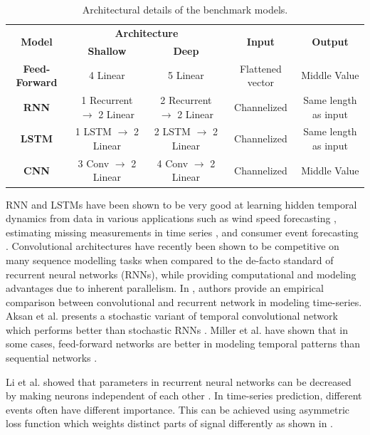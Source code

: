 \documentclass[letterpaper]{article}
\begin{document}
\begin{table}[h]
    \centering
    \begin{tabular}{c c c c c}
        \toprule
          \multirow{2}{*}{\textbf{Model}} & \multicolumn{2}{c}{\textbf{Architecture}} & \multirow{2}{*}{\textbf{Input}} & \multirow{2}{*}{\textbf{Output}} \\
          \cmidrule(lr){2-3}
          & \textbf{Shallow} & \textbf{Deep} & & \\
         \midrule
         \textbf{Feed-Forward} & 4 Linear & 5 Linear & Flattened vector & Middle Value \\
         \textbf{RNN} & 1 Recurrent $\rightarrow$ 2 Linear & 2 Recurrent $\rightarrow$ 2 Linear & Channelized & Same length as input \\
         \textbf{LSTM} & 1 LSTM $\rightarrow$ 2 Linear & 2 LSTM $\rightarrow$ 2 Linear & Channelized & Same length as input \\
         \textbf{CNN} & 3 Conv $\rightarrow$ 2 Linear & 4 Conv $\rightarrow$ 2 Linear & Channelized & Middle Value \\
         \bottomrule
    \end{tabular}
    \caption{Architectural details of the benchmark models.}
    \label{tab:benchmark_models}
\end{table}

 RNN and LSTMs have been shown to be very good at learning hidden temporal dynamics from data in various applications such as wind speed forecasting \cite{ghaderi2017icml}, estimating missing measurements in time series \cite{yoon2017icml}, and consumer event forecasting \cite{laptev2017icml}. Convolutional architectures have recently been shown to be competitive on many sequence modelling tasks when compared to the de-facto standard of recurrent neural networks (RNNs), while providing computational and modeling advantages due to inherent parallelism. In \cite{bai2018arxiv}, authors provide an empirical comparison between convolutional and recurrent network in modeling time-series. Aksan et al. presents a stochastic variant of temporal convolutional network which performs better than stochastic RNNs \cite{aksan2018stcn}. Miller et al. have shown that in some cases, feed-forward networks are better in modeling temporal patterns than sequential networks \cite{miller2018stable}.

Li et al. showed that parameters in recurrent neural networks can be decreased by making neurons independent of each other \cite{li2018indrnn}. In time-series prediction, different events often have different importance. This can be achieved using asymmetric loss function which weights distinct parts of signal differently as shown in \cite{christoffersen_diebold_1997}.
\end{document}
